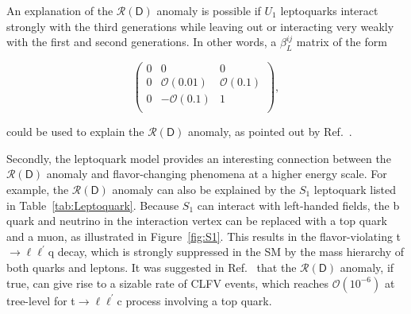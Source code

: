 An explanation of the $\mathcal{R}(\textsf{D})$ anomaly is possible if $U_{1}$ leptoquarks interact strongly with the third generations while leaving out or interacting very weakly with the first and second generations. In other words, a $\beta^{ij}_{L}$ matrix of the form

\begin{equation}
\begin{pmatrix}
0 & 0 & 0\\
0 & \mathcal{O}(0.01) & \mathcal{O}(0.1)\\
0 & -\mathcal{O}(0.1) & 1\\
\end{pmatrix},
\end{equation}

could be used to explain the $\mathcal{R}(\textsf{D})$ anomaly, as pointed out by Ref.~\cite{Cornella:2021sby}.

Secondly, the leptoquark model provides an interesting connection between the $\mathcal{R}(\textsf{D})$ anomaly and flavor-changing phenomena at a higher energy scale. For example, the $\mathcal{R}(\textsf{D})$ anomaly can also be explained by the $S_1$ leptoquark listed in Table~\ref{tab:Leptoquark}. Because $S_1$ can interact with left-handed fields, the b quark and neutrino in the interaction vertex can be replaced with a top quark and a muon, as illustrated in Figure~\ref{fig:S1}. This results in the flavor-violating t$\rightarrow\ell\ell^{\prime}$q decay, which is strongly suppressed in the \ac{SM} by the mass hierarchy of both quarks and leptons. It was suggested in Ref.~\cite{Kim:2018oih} that the $\mathcal{R}(\textsf{D})$ anomaly, if true, can give rise to a sizable rate of \ac{CLFV} events, which reaches $\mathcal{O}(10^{-6})$ at tree-level for t$\rightarrow\ell\ell^{\prime}$c process involving a top quark.

